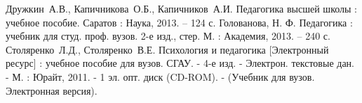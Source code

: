 \documentclass[14pt]{extarticle}
\theoremstyle{theorem}
\theoremstyle{remark}
\begin{document}
\newpage
{}

\begin{thebibliography}{99}
Дружкин~А.В., Капичникова~О.Б., Капичников~А.И. Педагогика высшей школы : учебное пособие. Саратов : Наука, 2013. -- 124 с. 
Голованова, Н. Ф. Педагогика : учебник для студ. проф. вузов. 2-е изд., стер. М. : Академия, 2013. -- 240 с.
  Столяренко~Л.Д., Столяренко~В.Е. Психология и педагогика [Электронный ресурс] : учебное пособие
для вузов. СГАУ. - 4-е изд. - Электрон. текстовые
дан. - М. : Юрайт, 2011. - 1 эл. опт. диск (CD-ROM). - (Учебник для вузов. Электронная версия).
\end{thebibliography}
\end{document}
